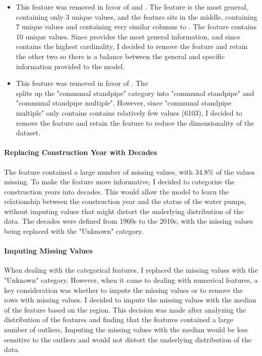 \documentclass{article}
\begin{document}
\begin{itemize}
  \item {} This feature was removed in favor of  and . The  feature is the most general, containing only 3 unique values, and the  feature sits in the middle, containing 7 unique values and containing very similar columns to . The  feature contains 10 unique values. Since  provides the most general information, and since  contains the highest cardinality, I decided to remove the  feature and retain the other two so there is a balance between the general and specific information provided to the model.
  \item {} This feature was removed in favor of . The \\  splits up the "communal standpipe" category into "communal standpipe" and "communal standpipe multiple". However, since "communal standpipe multiple" only contains contains relatively few values (6103), I decided to remove the  feature and retain the  feature to reduce the dimensionality of the dataset.
\end{itemize}

\paragraph{Replacing Construction Year with Decades}
The  feature contained a large number of missing values, with 34.8\% of the values missing. To make the feature more informative, I decided to categorize the construction years into decades. This would allow the model to learn the relationship between the construction year and the status of the water pumps, without imputing values that might distort the underlying distribution of the data. The decades were defined from 1960s to the 2010s, with the missing values being replaced with the "Unknown" category.

\paragraph{Imputing Missing Values}
When dealing with the categorical features, I replaced the missing values with the "Unknown" category. However, when it came to dealing with numerical features, a key consideration was whether to impute the missing values or to remove the rows with missing values. I decided to impute the missing values with the median of the feature based on the region. This decision was made after analyzing the distribution of the features and finding that the features contained a large number of outliers. Imputing the missing values with the median would be less sensitive to the outliers and would not distort the underlying distribution of the data.
\end{document}
